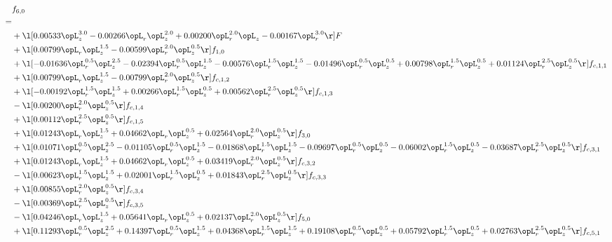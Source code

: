 \begin{alignat}{2} 
\label{eq:f_60_1} 
& f_{6,0} \nonumber \\ 
 = \\ 
& + \l[  0.00533 \opL_z^{3.0}   -0.00266 \opL_r \opL_z^{2.0} +  0.00200 \opL_r^{2.0} \opL_z   -0.00167 \opL_r^{3.0}  \r] F \nonumber \\ 
& + \l[  0.00799 \opL_r \opL_z^{1.5}   -0.00599 \opL_r^{2.0} \opL_z^{0.5}  \r] f_{1,0} \nonumber \\ 
& + \l[  -0.01636 \opL_r^{0.5} \opL_z^{2.5}   -0.02394 \opL_r^{0.5} \opL_z^{1.5}   -0.00576 \opL_r^{1.5} \opL_z^{1.5}   -0.01496 \opL_r^{0.5} \opL_z^{0.5} +  0.00798 \opL_r^{1.5} \opL_z^{0.5} +  0.01124 \opL_r^{2.5} \opL_z^{0.5}  \r] f_{c,1,1} \nonumber \\ 
& + \l[  0.00799 \opL_r \opL_z^{1.5}   -0.00799 \opL_r^{2.0} \opL_z^{0.5}  \r] f_{c,1,2} \nonumber \\ 
& + \l[  -0.00192 \opL_r^{1.5} \opL_z^{1.5} +  0.00266 \opL_r^{1.5} \opL_z^{0.5} +  0.00562 \opL_r^{2.5} \opL_z^{0.5}  \r] f_{c,1,3} \nonumber \\ 
& - \l[  0.00200 \opL_r^{2.0} \opL_z^{0.5}  \r] f_{c,1,4} \nonumber \\ 
& + \l[  0.00112 \opL_r^{2.5} \opL_z^{0.5}  \r] f_{c,1,5} \nonumber \\ 
& + \l[  0.01243 \opL_r \opL_z^{1.5} +  0.04662 \opL_r \opL_z^{0.5} +  0.02564 \opL_r^{2.0} \opL_z^{0.5}  \r] f_{3,0} \nonumber \\ 
& + \l[  0.01071 \opL_r^{0.5} \opL_z^{2.5}   -0.01105 \opL_r^{0.5} \opL_z^{1.5}   -0.01868 \opL_r^{1.5} \opL_z^{1.5}   -0.09697 \opL_r^{0.5} \opL_z^{0.5}   -0.06002 \opL_r^{1.5} \opL_z^{0.5}   -0.03687 \opL_r^{2.5} \opL_z^{0.5}  \r] f_{c,3,1} \nonumber \\ 
& + \l[  0.01243 \opL_r \opL_z^{1.5} +  0.04662 \opL_r \opL_z^{0.5} +  0.03419 \opL_r^{2.0} \opL_z^{0.5}  \r] f_{c,3,2} \nonumber \\ 
& - \l[  0.00623 \opL_r^{1.5} \opL_z^{1.5} +  0.02001 \opL_r^{1.5} \opL_z^{0.5} +  0.01843 \opL_r^{2.5} \opL_z^{0.5}  \r] f_{c,3,3} \nonumber \\ 
& + \l[  0.00855 \opL_r^{2.0} \opL_z^{0.5}  \r] f_{c,3,4} \nonumber \\ 
& - \l[  0.00369 \opL_r^{2.5} \opL_z^{0.5}  \r] f_{c,3,5} \nonumber \\ 
& - \l[  0.04246 \opL_r \opL_z^{1.5} +  0.05641 \opL_r \opL_z^{0.5} +  0.02137 \opL_r^{2.0} \opL_z^{0.5}  \r] f_{5,0} \nonumber \\ 
& + \l[  0.11293 \opL_r^{0.5} \opL_z^{2.5} +  0.14397 \opL_r^{0.5} \opL_z^{1.5} +  0.04368 \opL_r^{1.5} \opL_z^{1.5} +  0.19108 \opL_r^{0.5} \opL_z^{0.5} +  0.05792 \opL_r^{1.5} \opL_z^{0.5} +  0.02763 \opL_r^{2.5} \opL_z^{0.5}  \r] f_{c,5,1} \nonumber \\ 

\end{alignat}
